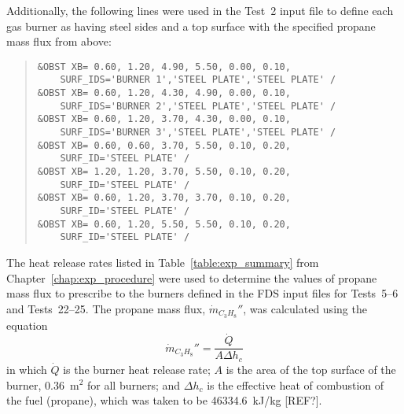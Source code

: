Additionally, the following lines were used in the Test~2 input file to define each gas burner as having steel sides and a top surface with the specified propane mass flux from above:
\begin{quote}
\begin{verbatim}
&OBST XB= 0.60, 1.20, 4.90, 5.50, 0.00, 0.10, 
    SURF_IDS='BURNER 1','STEEL PLATE','STEEL PLATE' /
&OBST XB= 0.60, 1.20, 4.30, 4.90, 0.00, 0.10, 
    SURF_IDS='BURNER 2','STEEL PLATE','STEEL PLATE' /
&OBST XB= 0.60, 1.20, 3.70, 4.30, 0.00, 0.10, 
    SURF_IDS='BURNER 3','STEEL PLATE','STEEL PLATE' /
&OBST XB= 0.60, 0.60, 3.70, 5.50, 0.10, 0.20, 
    SURF_ID='STEEL PLATE' /
&OBST XB= 1.20, 1.20, 3.70, 5.50, 0.10, 0.20, 
    SURF_ID='STEEL PLATE' /
&OBST XB= 0.60, 1.20, 3.70, 3.70, 0.10, 0.20, 
    SURF_ID='STEEL PLATE' /
&OBST XB= 0.60, 1.20, 5.50, 5.50, 0.10, 0.20, 
    SURF_ID='STEEL PLATE' /
\end{verbatim}
\end{quote}

The heat release rates listed in Table~\ref{table:exp_summary} from Chapter~\ref{chap:exp_procedure} were used to determine the values of propane mass flux to prescribe to the burners defined in the FDS input files for Tests~5--6 and Tests~22--25. The propane mass flux, $\dot{m}_{C_3H_8}''$, was calculated using the equation
\begin{equation}
  \dot{m}_{C_3H_8}''=\frac{\dot{Q}}{A\Delta h_c}
\end{equation}
in which $\dot{Q}$ is the burner heat release rate; $A$ is the area of the top surface of the burner, 0.36~m$^2$ for all burners; and $\Delta h_c$ is the effective heat of combustion of the fuel (propane), which was taken to be 46334.6~kJ/kg [REF?].

